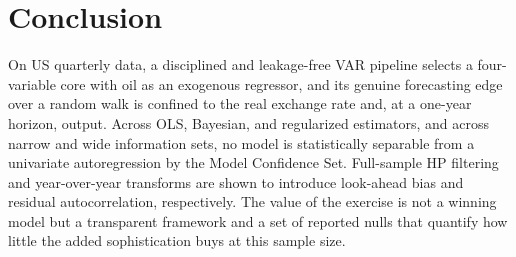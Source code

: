 \documentclass[conference]{IEEEtran}
\begin{document}
\section{Conclusion}
On US quarterly data, a disciplined and leakage-free VAR pipeline selects a four-variable core with oil as an exogenous regressor, and its genuine forecasting edge over a random walk is confined to the real exchange rate and, at a one-year horizon, output. Across OLS, Bayesian, and regularized estimators, and across narrow and wide information sets, no model is statistically separable from a univariate autoregression by the Model Confidence Set. Full-sample HP filtering and year-over-year transforms are shown to introduce look-ahead bias and residual autocorrelation, respectively. The value of the exercise is not a winning model but a transparent framework and a set of reported nulls that quantify how little the added sophistication buys at this sample size.
\end{document}
